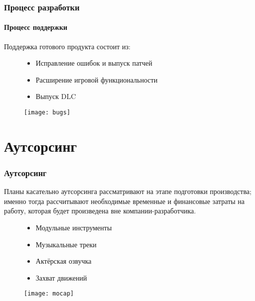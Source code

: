 \begin{frame}
    \frametitle{Процесс разработки}
    \framesubtitle{Процесс поддержки}
    Поддержка готового продукта состоит из:
    \begin{figure}
        \begin{minipage}{0.47\textwidth}
            \begin{itemize}
                \item Исправление ошибок и выпуск патчей
                \item Расширение игровой функциональности
                \item Выпуск DLC
            \end{itemize}
        \end{minipage}
        \begin{minipage}{0.5\textwidth}
            \texttt{[image: bugs]}
        \end{minipage}
    \end{figure}
\end{frame}

\section{Аутсорсинг}
\begin{frame}
    \frametitle{Аутсорсинг}
    Планы касательно аутсорсинга рассматривают на этапе подготовки производства; именно тогда 
    рассчитывают необходимые временные и финансовые затраты на работу, которая будет произведена вне 
    компании-разработчика.
    \begin{figure}
        \begin{minipage}{0.47\textwidth}
            \begin{itemize}
                \item Модульные инструменты
                \item Музыкальные треки
                \item Актёрская озвучка
                \item Захват движений
            \end{itemize}
        \end{minipage}
        \begin{minipage}{0.5\textwidth}
            \texttt{[image: mocap]}
        \end{minipage}
    \end{figure}
\end{frame}

